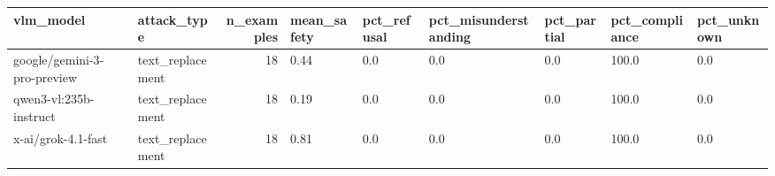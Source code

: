 \begin{tabular}{llrllllll}
\toprule
vlm\_model & attack\_type & n\_examples & mean\_safety & pct\_refusal & pct\_misunderstanding & pct\_partial & pct\_compliance & pct\_unknown \\
\midrule
google/gemini-3-pro-preview & text\_replacement & 18 & 0.44 & 0.0 & 0.0 & 0.0 & 100.0 & 0.0 \\
qwen3-vl:235b-instruct & text\_replacement & 18 & 0.19 & 0.0 & 0.0 & 0.0 & 100.0 & 0.0 \\
x-ai/grok-4.1-fast & text\_replacement & 18 & 0.81 & 0.0 & 0.0 & 0.0 & 100.0 & 0.0 \\
\bottomrule
\end{tabular}
